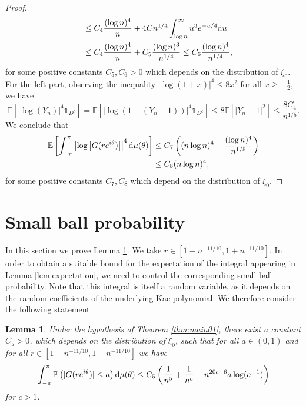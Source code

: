 \documentclass[12pt]{amsart}
\theoremstyle{plain}
\numberwithin{equation}{section}
\newtheorem{lemma}[theorem]{Lemma}
\renewcommand{\Pr}{\mathbb{P}}
\newcommand{\<}{\langle}
\renewcommand{\>}{\rangle}
\newcommand{\PP}[1]{\left(#1\right)}
\newcommand{\dd}{\textnormal{d}}
\newcommand{\E}[2][ ]{\mathbb{E}{#1}\left[#2\right]}
\newcommand{\abs}[1]{\left|#1\right|}
\renewcommand{\Pr}[1]{\mathds{P}\left(#1\right)}
\begin{document}
\begin{proof}
\begin{align*}
& \quad \leq C_4\frac{(\log n)^4}{n} + 4C n^{1/4} \int_{\log n}^{\infty} u^3 e^{-u/4} \dd u \\
& \quad \leq C_4\frac{(\log n)^4}{n} + C_5 \frac{(\log n)^3}{n^{1/4}} \leq C_6 \frac{(\log n)^4}{n^{1/4}}, 
\end{align*}
for some positive constants $C_5, C_6>0$ which depends on the distribution of $\xi_0$. For the left part, observing the inequality $\abs{\log(1+x)}^4 \leq 8 x^2$ for all $x \geq -\frac{1}{2}$, we have
\[
\E{ \abs{\log\PP{Y_n}}^4 \mathds{1}_{D^c}}  = \E{ \abs{\log\PP{1+(Y_n - 1)}}^4 \mathds{1}_{D^c}}  \leq 8\E{\abs{Y_n-1}^2} \leq \frac{8C_4}{ n^{1/5}}.
\]
We conclude that
\begin{align*}
\E{  \int_{-\pi}^{\pi} \abs{\log\abs{G(re^{i\theta})}}^4 \dd\mu(\theta) } & \leq C_7 \PP{ (n\log n)^4 + \frac{(\log n)^4}{n^{1/5}} }  \\
& \leq C_8 (n\log n)^4,
\end{align*}
for some positive constants $C_7, C_8$ which depend on the distribution of $\xi_0$.
\end{proof}

\section{Small ball probability} \label{sec:small.ball.probability}

In this section we prove Lemma \ref{lem:small.ball.probability}. We take $r\in [1-n^{-11/10},1+n^{-11/10}]$. In order to obtain a suitable bound for the expectation of the integral appearing in Lemma \ref{lem:expectation}, we need to control the corresponding small ball probability. Note that this integral is itself a random variable, as it depends on the random coefficients of the underlying Kac polynomial. We therefore consider the following statement.

\begin{lemma}\label{lem:small.ball.probability} Under the hypothesis of Theorem \ref{thm:main01}, there exist a constant $C_5>0$, which depends on the distribution of $\xi_0$, such that for all $a \in (0,1)$ and for all $r \in [1-n^{-11/10},1+n^{-11/10}]$ we have
\[
\int_{-\pi}^{\pi} \mathbb{P}\left( |G(re^{i\theta})| \leq a \right) \textnormal{d} \mu(\theta) \leq C_5 \PP{ \frac{1}{n^5} + \frac{1}{n^c} + n^{20c+6} a\log(a^{-1}) }
\]
for $c>1$.
\end{lemma}
\end{document}
